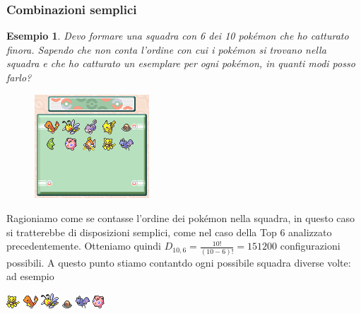 \documentclass{article}     %
\newtheorem{ex}{Esempio}[section]
\begin{document}
            \subsubsection{Combinazioni semplici}
            \begin{ex}
                Devo formare una squadra con 6 dei 10 pokémon che ho catturato finora. Sapendo che non conta l'ordine con cui i pokémon si trovano nella squadra  e che ho catturato un esemplare per ogni pokémon, in quanti modi posso farlo?
                
            \end{ex}
            \begin{figure}
                \includegraphics[width=0.9\linewidth]{pkmn/Box.png} 
            \end{figure}
            Ragioniamo come se contasse l'ordine dei pokémon nella squadra, in questo caso si tratterebbe di disposizioni semplici, come nel caso della Top 6 analizzato precedentemente. Otteniamo quindi $D_{10,6}=\frac{10!}{(10-6)!}=151200$ configurazioni possibili. A questo punto stiamo contantdo ogni possibile squadra diverse volte: ad esempio
            \begin{center}
                \includegraphics{pkmn/A.png} \includegraphics{pkmn/C.png} \includegraphics{pkmn/B.png} \includegraphics{pkmn/D.png} \includegraphics{pkmn/Z.png} \includegraphics{pkmn/J.png}
            \end{center} 
\end{document}
